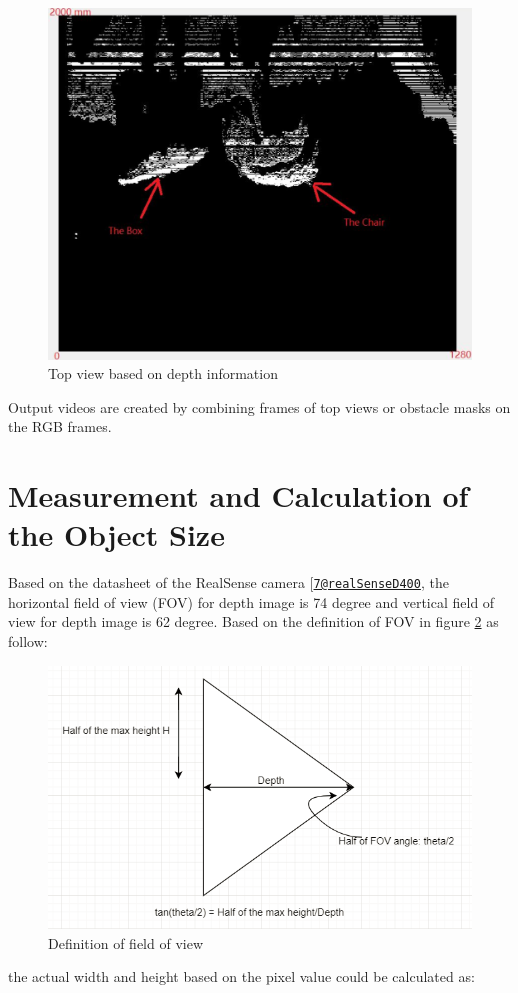 \documentclass[
  oneside]{ubcthesis}
\begin{document}
\begin{figure}

{\centering \includegraphics[width=0.3\linewidth]{figures/4} 

}

\caption{Top view based on depth information}\label{fig:figure4}
\end{figure}



Output videos are created by combining frames of top views or obstacle masks on the RGB frames.

\hypertarget{measurement-and-calculation-of-the-object-size}{%
\section{Measurement and Calculation of the Object Size}\label{measurement-and-calculation-of-the-object-size}}

Based on the datasheet of the RealSense camera {[}\href{mailto:7@realSenseD400}{\nolinkurl{7@realSenseD400}}, the horizontal field of view (FOV) for depth image is 74 degree and vertical field of view for depth image is 62 degree. Based on the definition of FOV in figure \ref{fig:figure5} as follow:

\begin{figure}

{\centering \includegraphics[width=0.6\linewidth]{figures/5} 

}

\caption{Definition of field of view}\label{fig:figure5}
\end{figure}



the actual width and height based on the pixel value could be calculated as:
\end{document}
